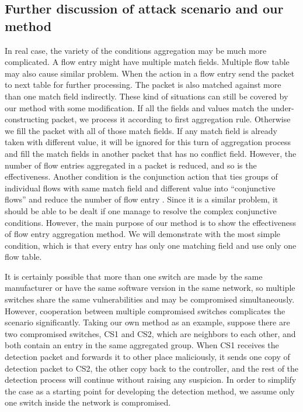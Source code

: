 \subsection{Further discussion of attack scenario and our method}
\label{Further_discussion}

In real case, the variety of the conditions aggregation may be much more complicated. A flow entry might have multiple match fields. Multiple flow table may also cause similar problem. When the action in a flow entry send the packet to next table for further processing. The packet is also matched against more than one match field indirectly. These kind of situations can still be covered by our method with some modification. If all the fields and values match the under-constructing packet, we process it according to first aggregation rule. Otherwise we fill the packet with all of those match fields. If any match field is already taken with different value, it will be ignored for this turn of aggregation process and fill the match fields in another packet that has no conflict field. However, the number of flow entries aggregated in a packet is reduced, and so is the effectiveness. Another condition is the conjunction action that ties groups of individual flows with same match field and different value into ``conjunctive flows'' and reduce the number of flow entry \cite{OVS_OFCTL}. Since it is a similar problem, it should be able to be dealt if one manage to resolve the complex conjunctive conditions. However, the main purpose of our method is to show the effectiveness of flow entry aggregation method. We will demonstrate with the most simple condition, which is that every entry has only one matching field and use only one flow table.

It is certainly possible that more than one switch are made by the same manufacturer or have the same software version in the same network, so multiple switches share the same vulnerabilities and may be compromised simultaneously. However, cooperation between multiple compromised switches complicates the scenario significantly. Taking our own method as an example, suppose there are two compromised switches, CS1 and CS2, which are neighbors to each other, and both contain an entry in the same aggregated group. When CS1 receives the detection packet and forwards it to other place maliciously, it sends one copy of detection packet to CS2, the other copy back to the controller, and the rest of the detection process will continue without raising any suspicion\sout{}. In order to simplify the case as a starting point for developing the detection method, we assume only one switch inside the network is compromised.

